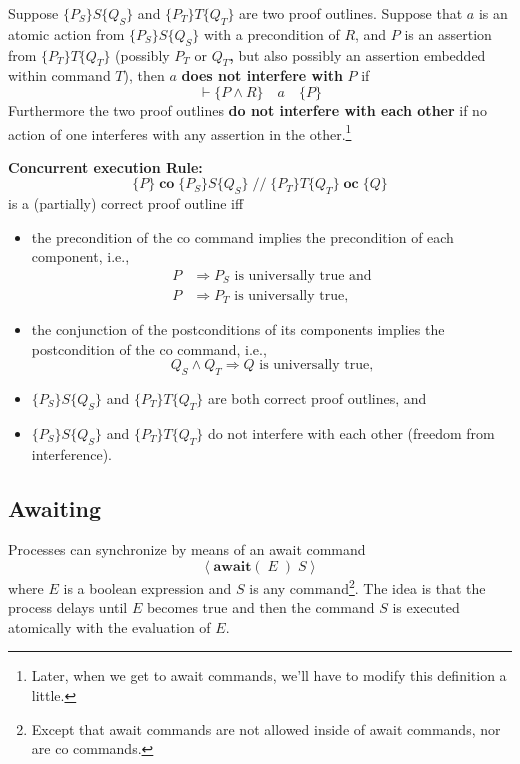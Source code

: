 \documentclass[11pt]{article}%
\begin{document}
Suppose $\{P_{S}\}S\{Q_{S}\}$ and $\{P_{T}\}T\{Q_{T}\}$ are two proof
outlines. Suppose that $a$ is an atomic action from $\{P_{S}\}S\{Q_{S}\}$ with
a precondition of $R$, and $P$ is an assertion from $\{P_{T}\}T\{Q_{T}\}$
(possibly $P_{T}$ or $Q_{T}$\textbf{,} but also possibly an assertion embedded
within command $T$), then $a$ \textbf{does not interfere with} $P$ if%
\[
\vdash\{P\wedge R\}\quad a\quad\{P\}
\]
Furthermore the two proof outlines \textbf{do not interfere with each other}
if no action of one interferes with any assertion in the
other.\footnote{Later, when we get to await commands, we'll have to modify
this definition a little.}

\textbf{Concurrent execution Rule:}
\[
\{P\}\;\mathbf{co}\;\{P_{S}\}S\{Q_{S}\}\;//\;\{P_{T}\}T\{Q_{T}\}\;\mathbf{oc}%
\;\{Q\}
\]
is a (partially) correct proof outline iff

\begin{itemize}
\item the precondition of the co command implies the precondition of each
component, i.e.,%
\begin{align*}
P  &  \Rightarrow P_{S}\text{ is universally true and}\\
P  &  \Rightarrow P_{T}\text{ is universally true,}%
\end{align*}


\item the conjunction of the postconditions of its components implies the
postcondition of the co command, i.e.,%
\[
Q_{S}\wedge Q_{T}\Rightarrow Q\text{ is universally true,}%
\]


\item $\{P_{S}\}S\{Q_{S}\}$ and $\{P_{T}\}T\{Q_{T}\}$ are both correct proof
outlines, and

\item $\{P_{S}\}S\{Q_{S}\}$ and $\{P_{T}\}T\{Q_{T}\}$ do not interfere with
each other (freedom from interference).
%

\end{itemize}

\subsection{Awaiting}

Processes can synchronize by means of an await command%
\[
\left\langle \mathbf{await}(\;E\;)\;S\right\rangle
\]
where $E$ is a boolean expression and $S$ is any command\footnote{Except that
await commands are not allowed inside of await commands, nor are co
commands.}. The idea is that the process delays until $E$ becomes true and
then the command $S$ is executed atomically with the evaluation of $E$.
\end{document}
